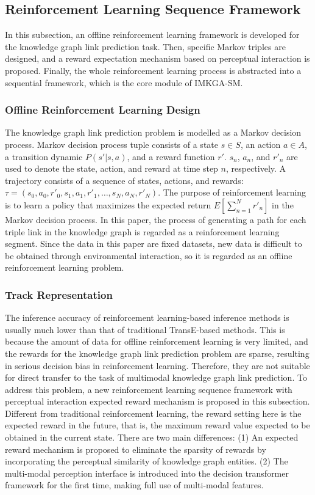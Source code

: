 \documentclass[10pt,journal,compsoc]{IEEEtran}
\begin{document}
\subsection{Reinforcement Learning Sequence Framework}\label{p2}
In this subsection, an offline reinforcement learning framework is developed for the knowledge graph link prediction task. Then, specific Markov triples are designed, and a reward expectation mechanism based on perceptual interaction is proposed. Finally, the whole reinforcement learning process is abstracted into a sequential framework, which is the core module of IMKGA-SM.

\subsubsection{Offline Reinforcement Learning Design}
The knowledge graph link prediction problem is modelled as a Markov decision process. Markov decision process tuple consists of a state $s \in S$, an action $a \in A$, a transition dynamic $P\left( {s'\left| {s, a} \right.} \right)$, and a reward function $r'$. $s_n$, $a_n$, and $r'_n$ are used to denote the state, action, and reward at time step $n$, respectively. A trajectory consists of a sequence of states, actions, and rewards: $\tau  = \left( {{s_0},{a_0},{r'_0},{s_1},{a_1},{r'_1}, \ldots,{s_N},{a_N},{r'_N}} \right)$. The purpose of reinforcement learning is to learn a policy that maximizes the expected return $E\left[ {\sum\nolimits_{n = 1}^N {{r'_n}} } \right]$ in the Markov decision process. In this paper, the process of generating a path for each triple link in the knowledge graph is regarded as a reinforcement learning segment. Since the data in this paper are fixed datasets, new data is difficult to be obtained through environmental interaction, so it is regarded as an offline reinforcement learning problem.\par

\subsubsection{Track Representation}
The inference accuracy of reinforcement learning-based inference methods is usually much lower than that of traditional TransE-based methods. This is because the amount of data for offline reinforcement learning is very limited, and the rewards for the knowledge graph link prediction problem are sparse, resulting in serious decision bias in reinforcement learning. Therefore, they are not suitable for direct transfer to the task of multimodal knowledge graph link prediction. To address this problem, a new reinforcement learning sequence framework with perceptual interaction expected reward mechanism is proposed in this subsection. Different from traditional reinforcement learning, the reward setting here is the expected reward in the future, that is, the maximum reward value expected to be obtained in the current state. There are two main differences: (1) An expected reward mechanism is proposed to eliminate the sparsity of rewards by incorporating the perceptual similarity of knowledge graph entities. (2) The multi-modal perception interface is introduced into the decision transformer framework for the first time, making full use of multi-modal features.
\end{document}
